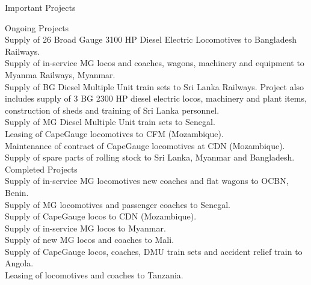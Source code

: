 Important Projects

Ongoing Projects\\

Supply of 26 Broad Gauge 3100 HP Diesel Electric Locomotives to Bangladesh Railways.\\
Supply of in-service MG locos and coaches, wagons, machinery and equipment to Myanma Railways, Myanmar.\\
Supply of BG Diesel Multiple Unit train sets to Sri Lanka Railways.  Project also includes supply of 3 BG 2300 HP diesel electric locos, machinery and plant items, construction of sheds and training of Sri Lanka personnel.\\
Supply of MG Diesel Multiple Unit train sets to Senegal.\\
Leasing of CapeGauge locomotives to CFM (Mozambique).\\
Maintenance of contract of CapeGauge locomotives at CDN (Mozambique).\\
Supply of spare parts of rolling stock to Sri Lanka, Myanmar and  Bangladesh. \\
 

Completed Projects\\

Supply of in-service MG locomotives new coaches and flat wagons to OCBN, Benin.\\
Supply of MG locomotives and passenger coaches to Senegal.\\
Supply of CapeGauge locos to CDN (Mozambique).\\
Supply of in-service MG locos to Myanmar.\\
Supply of new MG locos and coaches to Mali.\\
Supply of CapeGauge locos, coaches, DMU train sets and accident relief train to Angola.\\
Leasing of locomotives and coaches to Tanzania.\\

